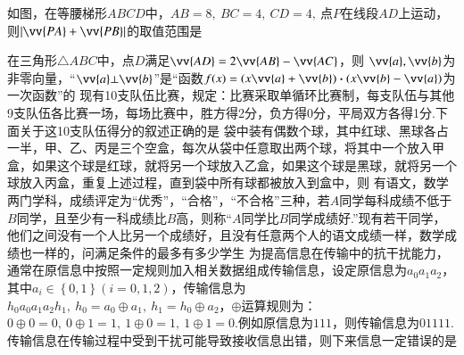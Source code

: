 \documentclass{BHCexam}
\begin{document}
\begin{questions}
\begin{center}
\end{center}
\qs 
如图，在等腰梯形$ ABCD $中，$ AB=8,~BC=4,~CD=4,~ $点$ P $在线段$ AD $上运动，则$\left|\vv{PA}+\vv{PB}\right| $的取值范围是\xx
{}
\vspace{-2em}
\begin{center}
\end{center}
\qs 在三角形$\triangle ABC$中，点$ D $满足$ \vv{AD}=2\vv{AB}-\vv{AC} $，则\xx
{}
\qs $\vv{a},\vv{b} $为非零向量，“$ \vv{a}\bot\vv{b} $”是“函数$ f(x)=(x\vv{a}+\vv{b})\bm\cdot(x\vv{b}-\vv{a}) $为一次函数”的\xx
{}
\qs 现有10支队伍比赛，规定：比赛采取单循环比赛制，每支队伍与其他9支队伍各比赛一场，每场比赛中，胜方得2分，负方得0分，平局双方各得1分.下面关于这10支队伍得分的叙述正确的是\xx
{} 
\qs 袋中装有偶数个球，其中红球、黑球各占一半，甲、乙、丙是三个空盒，每次从袋中任意取出两个球，将其中一个放入甲盒，如果这个球是红球，就将另一个球放入乙盒，如果这个球是黑球，就将另一个球放入丙盒，重复上述过程，直到袋中所有球都被放入到盒中，则\xx
{}
\qs 有语文，数学两门学科，成绩评定为“优秀”，“合格”，“不合格”三种，若$A$同学每科成绩不低于$B$同学，且至少有一科成绩比$B$高，则称“$A$同学比$ B $同学成绩好.”现有若干同学，他们之间没有一个人比另一个成绩好，且没有任意两个人的语文成绩一样，数学成绩也一样的，问满足条件的最多有多少学生\xx
{}
\qs 为提高信息在传输中的抗干扰能力，通常在原信息中按照一定规则加入相关数据组成传输信息，设定原信息为$ a_0a_1a_2 $，其中$ a_i\in\left\{0,1\right\}(i=0,1,2) $，传输信息为$ h_0a_0a_1a_2h_1,~h_0=a_0\oplus a_1,~h_1=h_0\oplus a_2 $，$ \oplus $运算规则为：$ 0\oplus 0=0,~0\oplus 1=1,~1\oplus 0=1,~1\oplus 1=0. $例如原信息为$ 111 $，则传输信息为$ 01111.~ $传输信息在传输过程中受到干扰可能导致接收信息出错，则下来信息一定错误的是\xx
{}
\end{questions}
\end{document}
